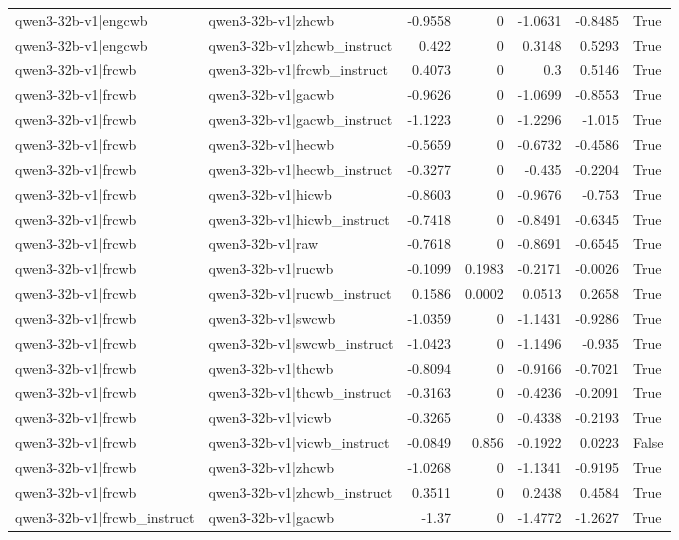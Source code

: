 \begin{table}
\begin{tabular}{l l r r r r l}
qwen3-32b-v1|engcwb & qwen3-32b-v1|zhcwb & -0.9558 & 0 & -1.0631 & -0.8485 & True \\
qwen3-32b-v1|engcwb & qwen3-32b-v1|zhcwb_instruct & 0.422 & 0 & 0.3148 & 0.5293 & True \\
qwen3-32b-v1|frcwb & qwen3-32b-v1|frcwb_instruct & 0.4073 & 0 & 0.3 & 0.5146 & True \\
qwen3-32b-v1|frcwb & qwen3-32b-v1|gacwb & -0.9626 & 0 & -1.0699 & -0.8553 & True \\
qwen3-32b-v1|frcwb & qwen3-32b-v1|gacwb_instruct & -1.1223 & 0 & -1.2296 & -1.015 & True \\
qwen3-32b-v1|frcwb & qwen3-32b-v1|hecwb & -0.5659 & 0 & -0.6732 & -0.4586 & True \\
qwen3-32b-v1|frcwb & qwen3-32b-v1|hecwb_instruct & -0.3277 & 0 & -0.435 & -0.2204 & True \\
qwen3-32b-v1|frcwb & qwen3-32b-v1|hicwb & -0.8603 & 0 & -0.9676 & -0.753 & True \\
qwen3-32b-v1|frcwb & qwen3-32b-v1|hicwb_instruct & -0.7418 & 0 & -0.8491 & -0.6345 & True \\
qwen3-32b-v1|frcwb & qwen3-32b-v1|raw & -0.7618 & 0 & -0.8691 & -0.6545 & True \\
qwen3-32b-v1|frcwb & qwen3-32b-v1|rucwb & -0.1099 & 0.1983 & -0.2171 & -0.0026 & True \\
qwen3-32b-v1|frcwb & qwen3-32b-v1|rucwb_instruct & 0.1586 & 0.0002 & 0.0513 & 0.2658 & True \\
qwen3-32b-v1|frcwb & qwen3-32b-v1|swcwb & -1.0359 & 0 & -1.1431 & -0.9286 & True \\
qwen3-32b-v1|frcwb & qwen3-32b-v1|swcwb_instruct & -1.0423 & 0 & -1.1496 & -0.935 & True \\
qwen3-32b-v1|frcwb & qwen3-32b-v1|thcwb & -0.8094 & 0 & -0.9166 & -0.7021 & True \\
qwen3-32b-v1|frcwb & qwen3-32b-v1|thcwb_instruct & -0.3163 & 0 & -0.4236 & -0.2091 & True \\
qwen3-32b-v1|frcwb & qwen3-32b-v1|vicwb & -0.3265 & 0 & -0.4338 & -0.2193 & True \\
qwen3-32b-v1|frcwb & qwen3-32b-v1|vicwb_instruct & -0.0849 & 0.856 & -0.1922 & 0.0223 & False \\
qwen3-32b-v1|frcwb & qwen3-32b-v1|zhcwb & -1.0268 & 0 & -1.1341 & -0.9195 & True \\
qwen3-32b-v1|frcwb & qwen3-32b-v1|zhcwb_instruct & 0.3511 & 0 & 0.2438 & 0.4584 & True \\
qwen3-32b-v1|frcwb_instruct & qwen3-32b-v1|gacwb & -1.37 & 0 & -1.4772 & -1.2627 & True \\

\end{tabular}
\end{table}

